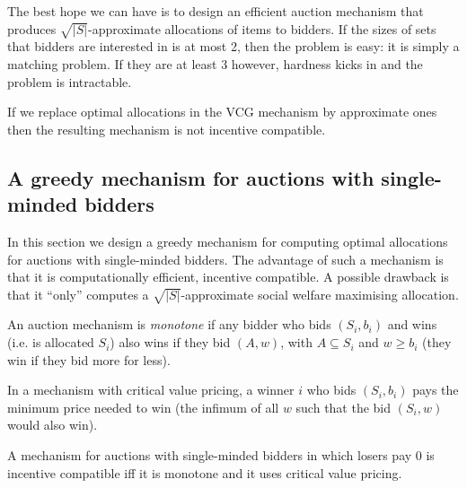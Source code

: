 The best hope we can have is to design an efficient auction mechanism that
produces $\sqrt{|S|}$-approximate allocations of items to bidders. If the sizes
of sets that bidders are interested in is at most 2, then the problem is easy:
it is simply a matching problem. If they are at least 3 however, hardness kicks
in and the problem is intractable.

\begin{fact}
	If we replace optimal allocations in the VCG mechanism by approximate ones
	then the resulting mechanism is not incentive compatible.
\end{fact}

\subsection{A greedy mechanism for auctions with single-minded bidders}

In this section we design a greedy mechanism for computing optimal allocations
for auctions with single-minded bidders. The advantage of such a mechanism is
that it is computationally efficient, incentive compatible. A possible drawback
is that it ``only'' computes a $\sqrt{|S|}$-approximate social welfare
maximising allocation.

An auction mechanism is \emph{monotone} if any bidder who bids $(S_i, b_i)$ and
wins (i.e. is allocated $S_i$) also wins if they bid $(A, w)$, with $A
\subseteq S_i$ and $w \ge b_i$ (they win if they bid more for less).

\begin{definition}
	In a mechanism with critical value pricing, a winner $i$ who bids $(S_i,
	b_i)$ pays the minimum price needed to win (the infimum of all $w$ such
	that the bid $(S_i, w)$ would also win).
\end{definition}

\begin{lemma}
	\label{lem:singleMindedDSIC}
	A mechanism for auctions with single-minded bidders in which losers pay 0
	is incentive compatible iff it is monotone and it uses critical value
	pricing.
\end{lemma}

